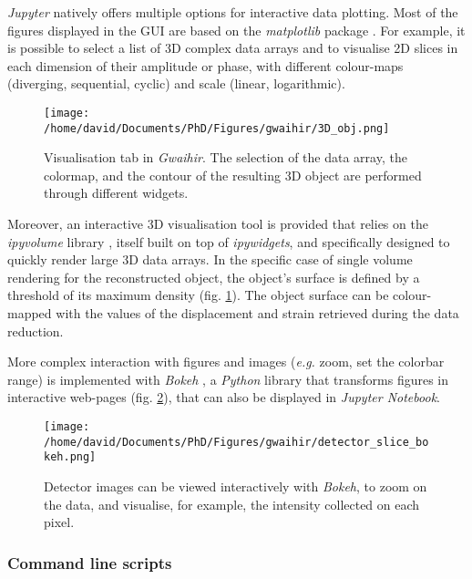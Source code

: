 \textit{Jupyter} natively offers multiple options for interactive data plotting.
Most of the figures displayed in the GUI are based on the \textit{matplotlib} package \parencite{Hunter2007}.
For example, it is possible to select a list of 3D complex data arrays and to visualise 2D slices in each dimension of their amplitude or phase, with different colour-maps (diverging, sequential, cyclic) and scale (linear, logarithmic).

\begin{figure}[!htb]
    \centering
    \texttt{[image: /home/david/Documents/PhD/Figures/gwaihir/3D\_obj.png]}
    \caption{
    Visualisation tab in \textit{Gwaihir}.
    The selection of the data array, the colormap, and the contour of the resulting 3D object are performed through different widgets.
    }
    \label{fig:3D_object}
\end{figure}

Moreover, an interactive 3D visualisation tool is provided that relies on the \textit{ipyvolume} library \parencite{Breddeld2021}, itself built on top of \textit{ipywidgets}, and specifically designed to quickly render large 3D data arrays.
In the specific case of single volume rendering for the reconstructed object, the object's surface is defined by a threshold of its maximum density (fig. \ref{fig:3D_object}).
The object surface can be colour-mapped with the values of the displacement and strain retrieved during the data reduction.

More complex interaction with figures and images (\textit{e.g.} zoom, set the colorbar range) is implemented with \textit{Bokeh} \parencite{Bokeh}, a \textit{Python} library that transforms figures in interactive web-pages (fig. \ref{fig:BokehDetector}), that can also be displayed in \textit{Jupyter Notebook}.

\begin{figure}[!htb]
    \centering
    \texttt{[image: /home/david/Documents/PhD/Figures/gwaihir/detector\_slice\_bokeh.png]}
    \caption{
    Detector images can be viewed interactively with \textit{Bokeh}, to zoom on the data, and visualise, for example, the intensity collected on each pixel.
    }
    \label{fig:BokehDetector}
\end{figure}

\subsubsection{Command line scripts}

